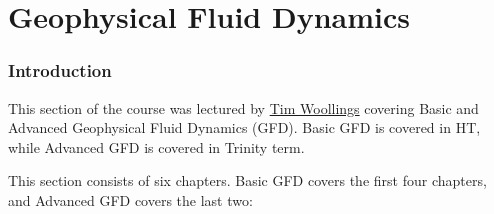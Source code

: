 \part{Geophysical Fluid Dynamics}\label{Geophysical Fluid Dynamics}

\section*{Introduction}

This section of the course was lectured by \href{https://www.physics.ox.ac.uk/our-people/woollings}{Tim Woollings} covering Basic and Advanced Geophysical Fluid Dynamics (GFD). Basic GFD is covered in HT, while Advanced GFD is covered in Trinity term.\vspace{5 mm}

\noindent This section consists of six chapters. Basic GFD covers the first four chapters, and Advanced GFD covers the last two:\vspace{5 mm}

